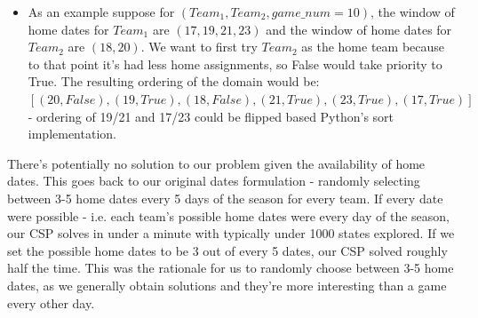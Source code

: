 \documentclass{article}
\begin{document}
\begin{enumerate}
		\begin{itemize}
			\item As an example suppose for $(Team_1,Team_2,game\_num=10)$, the window of home dates for $Team_1$ are $(17,19,21,23)$ and the window of home dates for $Team_2$ are $(18,20)$. We want to first try $Team_2$ as the home team because to that point it's had less home assignments, so False would take priority to True. The resulting ordering of the domain would be: $[(20,False),(19,True),(18,False),(21,True),(23,True),(17,True)]$ - ordering of 19/21 and 17/23 could be flipped based Python's sort implementation.
		\end{itemize}
	\end{enumerate}

	There's potentially no solution to our problem given the availability of home dates. This goes back to our original dates formulation - randomly selecting between 3-5 home dates every 5 days of the season for every team. If every date were possible - i.e. each team's possible home dates were every day of the season, our CSP solves in under a minute with typically under 1000 states explored. If we set the possible home dates to be 3 out of every 5 dates, our CSP solved roughly half the time. This was the rationale for us to randomly choose between 3-5 home dates, as we generally obtain solutions and they're more interesting than a game every other day.
\end{document}
